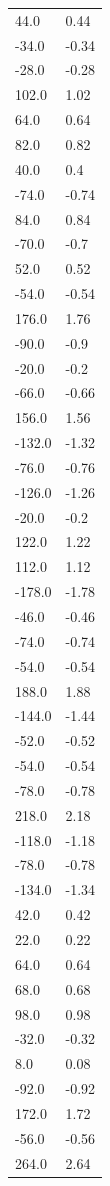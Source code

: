 \begin{longtable}{ll}
44.0 & 0.44 \\
-34.0 & -0.34 \\
-28.0 & -0.28 \\
102.0 & 1.02 \\
64.0 & 0.64 \\
82.0 & 0.82 \\
40.0 & 0.4 \\
-74.0 & -0.74 \\
84.0 & 0.84 \\
-70.0 & -0.7 \\
52.0 & 0.52 \\
-54.0 & -0.54 \\
176.0 & 1.76 \\
-90.0 & -0.9 \\
-20.0 & -0.2 \\
-66.0 & -0.66 \\
156.0 & 1.56 \\
-132.0 & -1.32 \\
-76.0 & -0.76 \\
-126.0 & -1.26 \\
-20.0 & -0.2 \\
122.0 & 1.22 \\
112.0 & 1.12 \\
-178.0 & -1.78 \\
-46.0 & -0.46 \\
-74.0 & -0.74 \\
-54.0 & -0.54 \\
188.0 & 1.88 \\
-144.0 & -1.44 \\
-52.0 & -0.52 \\
-54.0 & -0.54 \\
-78.0 & -0.78 \\
218.0 & 2.18 \\
-118.0 & -1.18 \\
-78.0 & -0.78 \\
-134.0 & -1.34 \\
42.0 & 0.42 \\
22.0 & 0.22 \\
64.0 & 0.64 \\
68.0 & 0.68 \\
98.0 & 0.98 \\
-32.0 & -0.32 \\
8.0 & 0.08 \\
-92.0 & -0.92 \\
172.0 & 1.72 \\
-56.0 & -0.56 \\
264.0 & 2.64 \\

\end{longtable}
